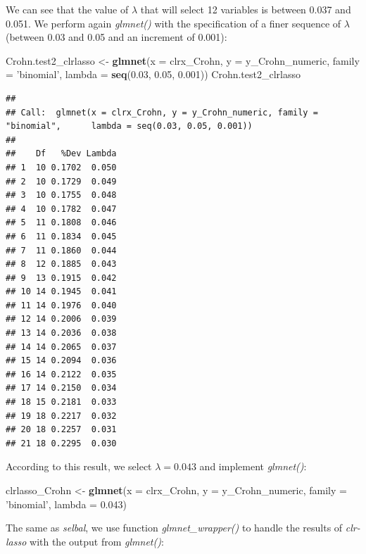 \documentclass[openany]{book}
\newenvironment{Shaded}{\begin{snugshade}}{\end{snugshade}}
\newcommand{\KeywordTok}[1]{\textcolor[rgb]{0.13,0.29,0.53}{\textbf{#1}}}
\newcommand{\DataTypeTok}[1]{\textcolor[rgb]{0.13,0.29,0.53}{#1}}
\newcommand{\FloatTok}[1]{\textcolor[rgb]{0.00,0.00,0.81}{#1}}
\newcommand{\StringTok}[1]{\textcolor[rgb]{0.31,0.60,0.02}{#1}}
\newcommand{\NormalTok}[1]{#1}
\begin{document}
We can see that the value of \(\lambda\) that will select 12 variables
is between 0.037 and 0.051. We perform again \emph{glmnet()} with the
specification of a finer sequence of \(\lambda\) (between 0.03 and 0.05
and an increment of 0.001):

\begin{Shaded}
\begin{Highlighting}[]
\NormalTok{Crohn.test2_clrlasso <-}\StringTok{ }\KeywordTok{glmnet}\NormalTok{(}\DataTypeTok{x =}\NormalTok{ clrx_Crohn, }\DataTypeTok{y =}\NormalTok{ y_Crohn_numeric, }
                               \DataTypeTok{family =} \StringTok{'binomial'}\NormalTok{, }\DataTypeTok{lambda =} \KeywordTok{seq}\NormalTok{(}\FloatTok{0.03}\NormalTok{, }\FloatTok{0.05}\NormalTok{, }\FloatTok{0.001}\NormalTok{))}
\NormalTok{Crohn.test2_clrlasso}
\end{Highlighting}
\end{Shaded}

\begin{verbatim}
## 
## Call:  glmnet(x = clrx_Crohn, y = y_Crohn_numeric, family = "binomial",      lambda = seq(0.03, 0.05, 0.001)) 
## 
##    Df   %Dev Lambda
## 1  10 0.1702  0.050
## 2  10 0.1729  0.049
## 3  10 0.1755  0.048
## 4  10 0.1782  0.047
## 5  11 0.1808  0.046
## 6  11 0.1834  0.045
## 7  11 0.1860  0.044
## 8  12 0.1885  0.043
## 9  13 0.1915  0.042
## 10 14 0.1945  0.041
## 11 14 0.1976  0.040
## 12 14 0.2006  0.039
## 13 14 0.2036  0.038
## 14 14 0.2065  0.037
## 15 14 0.2094  0.036
## 16 14 0.2122  0.035
## 17 14 0.2150  0.034
## 18 15 0.2181  0.033
## 19 18 0.2217  0.032
## 20 18 0.2257  0.031
## 21 18 0.2295  0.030
\end{verbatim}

According to this result, we select \(\lambda = 0.043\) and implement
\emph{glmnet()}:

\begin{Shaded}
\begin{Highlighting}[]
\NormalTok{clrlasso_Crohn <-}\StringTok{ }\KeywordTok{glmnet}\NormalTok{(}\DataTypeTok{x =}\NormalTok{ clrx_Crohn, }\DataTypeTok{y =}\NormalTok{ y_Crohn_numeric, }
                         \DataTypeTok{family =} \StringTok{'binomial'}\NormalTok{, }\DataTypeTok{lambda =} \FloatTok{0.043}\NormalTok{)}
\end{Highlighting}
\end{Shaded}

The same as \emph{selbal}, we use function \emph{glmnet\_wrapper()} to
handle the results of \emph{clr-lasso} with the output from
\emph{glmnet()}:
\end{document}

